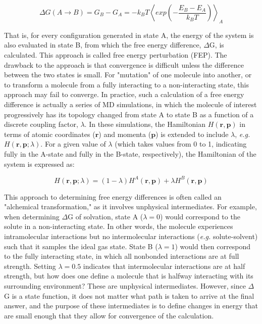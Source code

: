 \documentclass[9pt,tutorial,pubversion]{livecoms}
\begin{document}
\begin{equation} \label{fep_eq}
\Delta G(A \longrightarrow B) = G_B - G_A = -k_B T \left \langle exp \left(-\frac{E_B - E_A}{k_B T}\right)\right \rangle_A
\end{equation}

That is, for every configuration generated in state A, the energy of the system is also evaluated in state B, from which the free energy difference, $\Delta$G, is calculated. This approach is called free energy perturbation (FEP). The drawback to the approach is that convergence is difficult unless the difference between the two states is small. For "mutation" of one molecule into another, or to transform a molecule from a fully interacting to a non-interacting state, this approach may fail to converge. In practice, such a calculation of a free energy difference is actually a series of MD simulations, in which the molecule of interest progressively has its topology changed from state A to state B as a function of a discrete coupling factor, $\lambda$. In these simulations, the Hamiltonian $H(\mathbf{r}, \mathbf{p})$ in terms of atomic coordinates ($\mathbf{r}$) and momenta ($\mathbf{p}$) is extended to include $\lambda$, {\em e.g.} $H(\mathbf{r}, \mathbf{p}; \lambda)$. For a given value of $\lambda$ (which takes values from 0 to 1, indicating fully in the A-state and fully in the B-state, respectively), the Hamiltonian of the system is expressed as:

\begin{equation} \label{fes_hamiltonian_eq}
H(\mathbf{r},\mathbf{p};\lambda) = (1 - \lambda) H^A(\mathbf{r},\mathbf{p}) + \lambda H^B(\mathbf{r},\mathbf{p})
\end{equation}

This approach to determining free energy differences is often called an "alchemical transformation," as it involves unphysical intermediates. For example, when determining $\Delta$G of solvation, state A ($\lambda = 0$) would correspond to the solute in a non-interacting state. In other words, the molecule experiences intramolecular interactions but no intermolecular interactions ({\em e.g.} solute-solvent) such that it samples the ideal gas state. State B ($\lambda = 1$) would then correspond to the fully interacting state, in which all nonbonded interactions are at full strength. Setting $\lambda = 0.5$ indicates that intermolecular interactions are at half strength, but how does one define a molecule that is halfway interacting with its surrounding environment? These are unphysical intermediates. However, since $\Delta$G is a state function, it does not matter what path is taken to arrive at the final answer, and the purpose of these intermediates is to define changes in energy that are small enough that they allow for convergence of the calculation.
\end{document}
